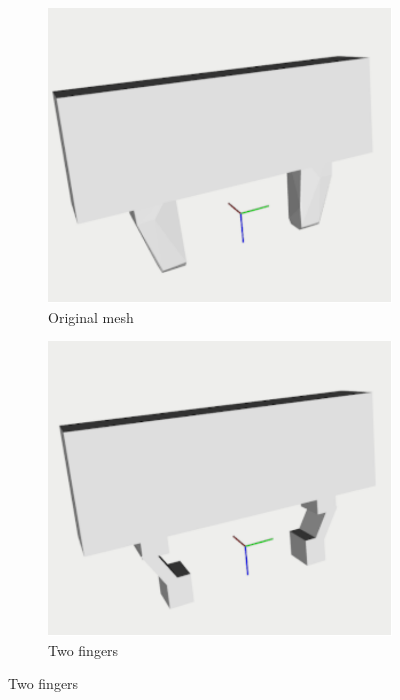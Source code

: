 \begin{figure}[t]
\centering
\begin{subfigure}{0.3\columnwidth}
    \includegraphics[width=\linewidth]{figures/mesh_cropped.pdf}
    \caption{Original mesh}\label{fig:original_mesh}
\end{subfigure}%
\hfill
\begin{subfigure}{0.3\columnwidth}
    \includegraphics[width=\linewidth]{figures/doulbe_simple_cropped.pdf}
    \caption{Two fingers}\label{fig:two_fingers}

\end{subfigure}
\end{figure}
